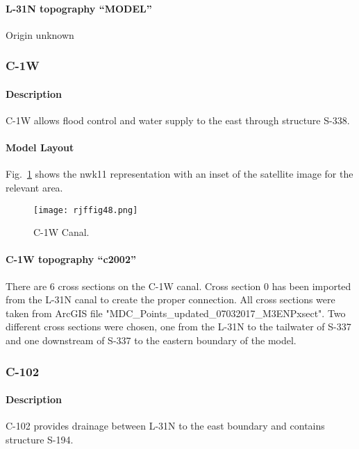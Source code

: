 \paragraph{L-31N topography ``MODEL''}
Origin unknown

\clearpage
\subsubsection{C-1W}
\paragraph{Description}
C-1W allows flood control and water supply to the east through structure S-338.

\paragraph{Model Layout}
Fig.~\ref{fig:rjffig48} shows the nwk11 representation with an inset of the satellite image for the relevant area.

\begin{figure}[!h]
  \begin{center}
  \texttt{[image: rjffig48.png]}
  \caption{C-1W Canal.}
  \label{fig:rjffig48}
  \end{center}
\end{figure}

\paragraph{C-1W topography ``c2002''}
There are 6 cross sections on the C-1W canal.  Cross section 0 has been imported from the L-31N canal to create the proper connection.  All cross sections were taken from ArcGIS file "MDC\_Points\_updated\_07032017\_M3ENPxsect".  Two different cross sections were chosen, one from the L-31N to the tailwater of S-337 and one downstream of S-337 to the eastern boundary of the model.


\clearpage
\subsubsection{C-102}
\paragraph{Description}
C-102 provides drainage between L-31N to the east boundary and contains structure S-194.


